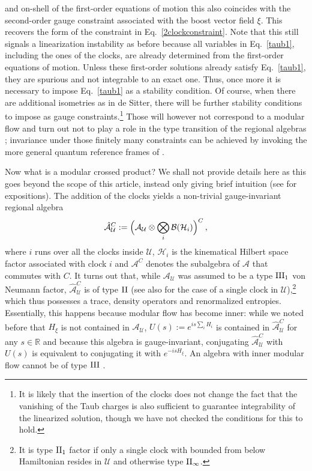 \documentclass[]{jkpaper}
\theoremstyle{plain}
\theoremstyle{definition}
\begin{document}
and on-shell of the first-order equations of motion this also coincides with the second-order gauge constraint associated with the boost vector field $\xi$. This recovers the form of the constraint in Eq.~\eqref{2clockconstraint}. Note that this still signals a linearization instability as before because all variables in Eq.~\eqref{taub1}, including the ones of the clocks, are already determined from the first-order equations of motion. Unless these first-order solutions already satisfy Eq.~\eqref{taub1}, they are spurious and not integrable to an exact one. Thus, once more it is necessary to impose Eq.~\eqref{taub1} as a stability condition. Of course, when there are additional isometries as in de Sitter, there will be further stability conditions to impose as gauge constraints.\footnote{It is likely that the insertion of the clocks does not change the fact that the vanishing of the Taub charges is also sufficient to guarantee integrability of the linearized solution, though we have not checked the conditions for this to hold.} Those will however not correspond to a modular flow and turn out not to play a role in the type transition of the regional algebras \cite{Chandrasekaran:2022cip}; invariance under those finitely many constraints can be achieved by invoking the more general quantum reference frames of \cite{delaHamette:2021oex}.  

Now what is a modular crossed product? We shall not provide details here as this goes beyond the scope of this article, instead only giving brief intuition (see \cite{Witten:2021unn,Chandrasekaran:2022cip,Jensen:2023yxy,Takesaki1979} for expositions). The addition of the clocks yields a non-trivial gauge-invariant regional algebra
\begin{equation}\label{algebra}
    \hat{\mathcal{A}}^C_{\mathcal U}:=\qty\Big(\mathcal{A}_{\mathcal{U}}\otimes\bigotimes_i\mathcal{B}(\mathcal{H}_i))^C\,,
\end{equation}
where $i$ runs over all the clocks inside $\mathcal U$, $\mathcal{H}_i$ is the kinematical Hilbert space factor associated with clock $i$ and $\mathcal{A}^C$ denotes the subalgebra of $\mathcal{A}$ that commutes with $C$. It turns out that, while $\mathcal{A}_\mathcal{U}$ was assumed to be a type $\rm{III}_1$ von Neumann factor, $\hat{\mathcal{A}}^C_\mathcal{U}$ is of type $\rm{II}$ \cite{DeVuyst:2024pop,DVEHK} (see also \cite{Chandrasekaran:2022cip,Jensen:2023yxy,Chen:2024rpx} for the case of a single clock in $\mathcal U$),\footnote{It is type $\rm{II}_1$ factor if only a single clock with bounded from below Hamiltonian resides in $\mathcal U$ and otherwise type $\rm{II}_\infty$.} which thus possesses a trace, density operators and renormalized entropies. Essentially, this happens because modular flow has become inner: while we noted before that $H_\xi$ is not contained in $\mathcal{A}_\mathcal{U}$, $U(s):=e^{is\sum_i H_i}$ is contained in $\hat{\mathcal{A}}^C_\mathcal{U}$ for any $s\in\mathbb{R}$ and because this algebra is gauge-invariant, conjugating $\hat{\mathcal{A}}^C_\mathcal{U}$ with $U(s)$ is equivalent to conjugating it with $e^{-is H_\xi}$. An algebra with inner modular flow cannot be of type $\rm{III}$ \cite{Takesaki1979}.
\end{document}
